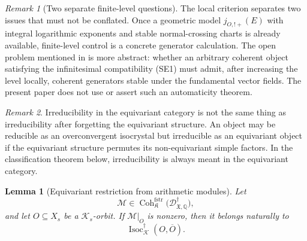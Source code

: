 \documentclass[11pt]{amsart}
\theoremstyle{plain}
\newtheorem{lemma}{Lemma}[section]
\theoremstyle{definition}
\theoremstyle{remark}
\newtheorem{remark}{Remark}[section]
\newcommand{\Coh}{\operatorname{Coh}}
\newcommand{\Isoc}{\operatorname{Isoc}}
\newcommand{\fstr}{\mathrm{fstr}}
\begin{document}
\begin{remark}[Two separate finite-level questions]
\label{rem:two-SE2-questions}
The local criterion separates two issues that must not be conflated.  Once a
geometric model \(j_{O,!+}(E)\) with integral logarithmic exponents and stable
normal-crossing charts is already available, finite-level control is a concrete
generator calculation.  The open problem mentioned in
 is more abstract: whether an arbitrary
coherent object satisfying the infinitesimal compatibility \textup{(SE1)} must
admit, after increasing the level locally, coherent generators stable under the
fundamental vector fields.  The present paper does not use or assert such an
automaticity theorem.
\end{remark}

\begin{remark}
\label{rem:irreducible-equivariant-vs-nonequivariant}
Irreducibility in the equivariant category is not the same thing as
irreducibility after forgetting the equivariant structure. An object may be
reducible as an overconvergent isocrystal but irreducible as an equivariant
object if the equivariant structure permutes its non-equivariant simple factors.
In the classification theorem below, irreducibility is always meant in the
equivariant category.
\end{remark}

\begin{lemma}[Equivariant restriction from arithmetic modules]
\label{lem:restriction-equvariant-isocrystal}
Let
\[
  \mathcal M\in
  \Coh^{\fstr}_{\mathfrak K}
  \bigl(\mathscr D^\dagger_{\mathfrak X,\mathbb Q}\bigr),
\]
and let \(O\subseteq X_s\) be a \(\mathcal K_s\)-orbit. If \(\mathcal M|_O\) is
nonzero, then it belongs naturally to
\[
  \Isoc^{\dagger}_{\mathcal K}(O,\overline O).
\]
\end{lemma}
\end{document}
